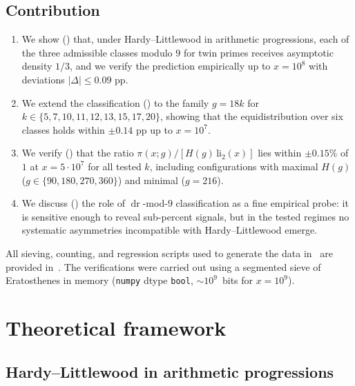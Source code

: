 \documentclass[11pt]{amsart}
\theoremstyle{plain}
\theoremstyle{definition}
\theoremstyle{remark}
\DeclareMathOperator{\dr}{dr}
\begin{document}
\subsection*{Contribution}
\begin{enumerate}
\item We show () that, under Hardy--Littlewood in
  arithmetic progressions, each of the three admissible classes modulo
  $9$ for twin primes receives asymptotic density $1/3$, and we verify
  the prediction empirically up to $x = 10^8$ with deviations
  $|\Delta| \le 0.09$ pp.
\item We extend the classification () to the family
  $g = 18k$ for $k \in \{5,7,10,11,12,13,15,17,20\}$, showing that
  the equidistribution over six classes holds within $\pm 0.14$ pp up
  to $x = 10^7$.
\item We verify () that the ratio
  $\pi(x;g)/[H(g)\,\mathrm{li}_2(x)]$ lies within $\pm 0.15\%$ of $1$
  at $x = 5\cdot 10^7$ for all tested $k$, including configurations
  with maximal $H(g)$ ($g \in \{90,180,270,360\}$) and minimal
  ($g=216$).
\item We discuss () the role of $\dr$-mod-$9$
  classification as a fine empirical probe: it is sensitive enough to
  reveal sub-percent signals, but in the tested regimes no systematic
  asymmetries incompatible with Hardy--Littlewood emerge.
\end{enumerate}

\smallskip
All sieving, counting, and regression scripts used to generate the data
in~ are provided
in~\cite{ScriptsRepo}. The verifications were carried out using a
segmented sieve of Eratosthenes in memory (\texttt{numpy} dtype
\texttt{bool}, $\sim 10^9$~bits for $x = 10^9$).

\section{Theoretical framework}\label{sec:framework}

\subsection{Hardy--Littlewood in arithmetic progressions}
\end{document}
